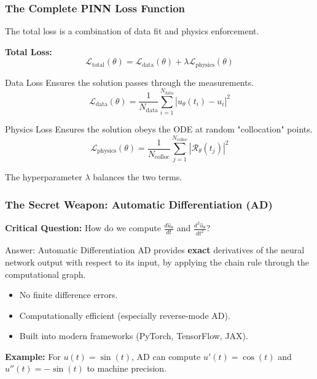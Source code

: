 \documentclass[notes]{beamer}
\begin{document}
\begin{frame}
\frametitle{The Complete PINN Loss Function}

The total loss is a combination of data fit and physics enforcement.

\textbf{Total Loss:}
\begin{equation*}
\mathcal{L}_{\text{total}}(\theta) = \mathcal{L}_{\text{data}}(\theta) + \lambda \mathcal{L}_{\text{physics}}(\theta)
\end{equation*}

\begin{block}{Data Loss}
Ensures the solution passes through the measurements.
\begin{equation*}
\mathcal{L}_{\text{data}}(\theta) = \frac{1}{N_{\text{data}}} \sum_{i=1}^{N_{\text{data}}} |\hat{u}_\theta(t_i) - u_i|^2
\end{equation*}
\end{block}

\begin{block}{Physics Loss}
Ensures the solution obeys the ODE at random "collocation" points.
\begin{equation*}
\mathcal{L}_{\text{physics}}(\theta) = \frac{1}{N_{\text{colloc}}} \sum_{j=1}^{N_{\text{colloc}}} |\mathcal{R}_\theta(t_j)|^2
\end{equation*}
\end{block}

The hyperparameter $\lambda$ balances the two terms.

\end{frame}

\begin{frame}
\frametitle{The Secret Weapon: Automatic Differentiation (AD)}

\textbf{Critical Question:} How do we compute $\frac{d\hat{u}_\theta}{dt}$ and $\frac{d^2\hat{u}_\theta}{dt^2}$?

\begin{alertblock}{Answer: Automatic Differentiation}
AD provides \textbf{exact} derivatives of the neural network output with respect to its input, by applying the chain rule through the computational graph.
\begin{itemize}
    \item No finite difference errors.
    \item Computationally efficient (especially reverse-mode AD).
    \item Built into modern frameworks (PyTorch, TensorFlow, JAX).
\end{itemize}
\end{alertblock}

\textbf{Example:} For $u(t) = \sin(t)$, AD can compute $u'(t)=\cos(t)$ and $u''(t)=-\sin(t)$ to machine precision.

\end{frame}
\end{document}
